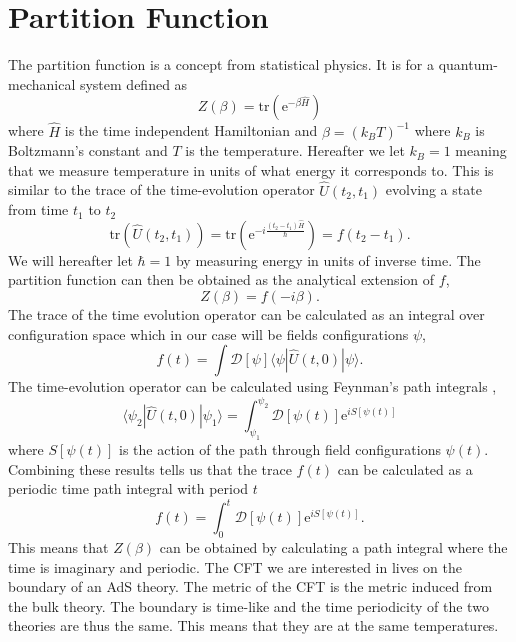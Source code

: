 \documentclass[12pt]{report}
\newcommand{\e}{\ensuremath{\mathrm{e}}}
\renewcommand{\i}{\ensuremath{i}}
\newcommand{\ket}[1]{|#1\rangle}
\newcommand{\bra}[1]{\langle#1|}
\newcommand{\bracket}[3]{\bra{#1}#2\ket{#3}}
\begin{document}
\section{Partition Function}
The partition function is a concept from statistical physics. It is for a quantum-mechanical system defined as
\begin{equation}
 Z(\beta)=\mathrm{tr}(\e^{-\beta\hat{H}})
\end{equation}
where $\hat{H}$ is the time independent Hamiltonian and $\beta=(k_BT)^{-1}$ where $k_B$ is Boltzmann's constant and $T$ is the temperature. Hereafter we let $k_B=1$ meaning that we measure temperature in units of what energy it corresponds to. This is similar to the trace of the time-evolution operator $\hat{U}(t_2,t_1)$ evolving a state from time $t_1$ to $t_2$
\begin{equation}
 \mathrm{tr}(\hat{U}(t_2,t_1))=\mathrm{tr}(\e^{-\i\frac{(t_2-t_1)\hat{H}}{\hbar}})=f(t_2-t_1).
\end{equation}
We will hereafter let $\hbar=1$ by measuring energy in units of inverse time. The partition function can then be obtained as the analytical extension of $f$,
\begin{equation}
 Z(\beta)=f(-\i\beta).
\end{equation}
The trace of the time evolution operator can be calculated as an integral over configuration space which in our case will be fields configurations $\psi$,
\begin{equation}
 f(t)=\int \mathcal{D}[\psi] \bracket{\psi}{\hat{U}(t,0)}{\psi}.
\end{equation}
The time-evolution operator can be calculated using Feynman's path integrals \cite{feynman1965quantum},
\begin{equation}
 \bracket{\psi_2}{\hat{U}(t,0)}{\psi_1}=\int_{\psi_1}^{\psi_2} \mathcal{D}[\psi(t)]\e^{\i S[\psi(t)]}
\end{equation}
where $S[\psi(t)]$ is the action of the path through field configurations $\psi(t)$. Combining these results tells us that the trace $f(t)$ can be calculated as a periodic time path integral with period $t$
\begin{equation}
 f(t)=\int_0^t \mathcal{D}[\psi(t)]\e^{\i S[\psi(t)]}.
\end{equation}
This means that $Z(\beta)$ can be obtained by calculating a path integral where the time is imaginary and periodic. The CFT we are interested in lives on the boundary of an AdS theory. The metric of the CFT is the metric induced from the bulk theory. The boundary is time-like and the time periodicity of the two theories are thus the same. This means that they are at the same temperatures.\\
\end{document}
